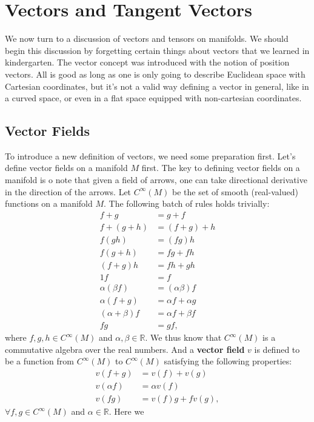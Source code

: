 \documentclass[a4paper,11pt]{article}
\theoremstyle{remark}
\begin{document}
\section{Vectors and Tangent Vectors}
\label{s:VT}
We now turn to a discussion of vectors and tensors on manifolds. We
should begin this discussion by forgetting certain things about
vectors that we learned in kindergarten. The vector concept was
introduced with the notion of position vectors. All is good as long as
one is only going to describe Euclidean space with Cartesian
coordinates, but it's not a valid way defining a vector in general,
like in a curved space, or even in a flat space equipped with
non-cartesian coordinates.
\subsection{Vector Fields}
\label{sub:vefi}
To introduce a new definition of vectors, we need some preparation
first. Let's define vector fields on a manifold $M$ first. The key to
defining vector fields on a manifold is o note that given a field of
arrows, one can take directional derivative in the direction of the
arrows. Let $C^{\infty}(M)$ be the set of smooth (real-valued)
functions on a manifold $M$. The following batch of rules holds trivially:
\begin{align*}
  f +g &= g+f\\
  f+(g+h)&=(f+g)+h\\
  f(g h)&=(f g)h\\
  f(g+h)&=f g+f h\\
  (f+g)h&=f h+g h\\
  1 f &= f\\
  \alpha( \beta f) &= ( \alpha \beta ) f \\
  \alpha(f+g) &= \alpha f+ \alpha g \\
  ( \alpha + \beta )f &= \alpha f + \beta f \\
  f g &=g f,
\end{align*}
where $f, g, h \in C^{\infty}(M)$ and $\alpha, \beta \in \mathbb{R}$.
We thus know that $C^{\infty}(M)$ is a commutative algebra over the
real numbers. And a \textbf{vector field} $v$ is defined to be a
function from $C^{\infty}(M)$ to $C^{\infty}(M)$ satisfying the
following properties:
\begin{align*}
  v(f+g)&=v(f)+v(g)\\
  v(\alpha f)&=\alpha v(f)\\
  v(f g)&=v(f) g+f v(g),
\end{align*}
$\forall f, g \in C^{\infty}(M)$ and $\alpha \in \mathbb{R}$. Here we
\end{document}
